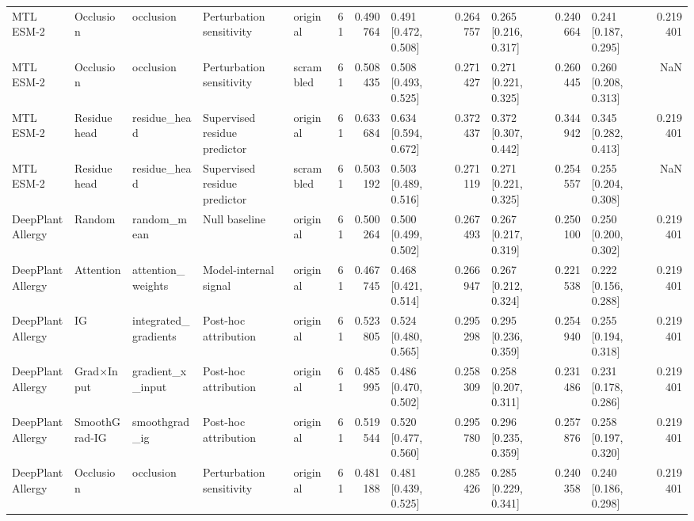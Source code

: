 \begin{tabular}{lllllrrlrlrlr}
MTL ESM-2 & Occlusion & occlusion & Perturbation sensitivity & original & 61 & 0.490764 & 0.491 [0.472, 0.508] & 0.264757 & 0.265 [0.216, 0.317] & 0.240664 & 0.241 [0.187, 0.295] & 0.219401 \\
MTL ESM-2 & Occlusion & occlusion & Perturbation sensitivity & scrambled & 61 & 0.508435 & 0.508 [0.493, 0.525] & 0.271427 & 0.271 [0.221, 0.325] & 0.260445 & 0.260 [0.208, 0.313] & NaN \\
MTL ESM-2 & Residue head & residue_head & Supervised residue predictor & original & 61 & 0.633684 & 0.634 [0.594, 0.672] & 0.372437 & 0.372 [0.307, 0.442] & 0.344942 & 0.345 [0.282, 0.413] & 0.219401 \\
MTL ESM-2 & Residue head & residue_head & Supervised residue predictor & scrambled & 61 & 0.503192 & 0.503 [0.489, 0.516] & 0.271119 & 0.271 [0.221, 0.325] & 0.254557 & 0.255 [0.204, 0.308] & NaN \\
DeepPlantAllergy & Random & random_mean & Null baseline & original & 61 & 0.500264 & 0.500 [0.499, 0.502] & 0.267493 & 0.267 [0.217, 0.319] & 0.250100 & 0.250 [0.200, 0.302] & 0.219401 \\
DeepPlantAllergy & Attention & attention_weights & Model-internal signal & original & 61 & 0.467745 & 0.468 [0.421, 0.514] & 0.266947 & 0.267 [0.212, 0.324] & 0.221538 & 0.222 [0.156, 0.288] & 0.219401 \\
DeepPlantAllergy & IG & integrated_gradients & Post-hoc attribution & original & 61 & 0.523805 & 0.524 [0.480, 0.565] & 0.295298 & 0.295 [0.236, 0.359] & 0.254940 & 0.255 [0.194, 0.318] & 0.219401 \\
DeepPlantAllergy & Grad×Input & gradient_x_input & Post-hoc attribution & original & 61 & 0.485995 & 0.486 [0.470, 0.502] & 0.258309 & 0.258 [0.207, 0.311] & 0.231486 & 0.231 [0.178, 0.286] & 0.219401 \\
DeepPlantAllergy & SmoothGrad-IG & smoothgrad_ig & Post-hoc attribution & original & 61 & 0.519544 & 0.520 [0.477, 0.560] & 0.295780 & 0.296 [0.235, 0.359] & 0.257876 & 0.258 [0.197, 0.320] & 0.219401 \\
DeepPlantAllergy & Occlusion & occlusion & Perturbation sensitivity & original & 61 & 0.481188 & 0.481 [0.439, 0.525] & 0.285426 & 0.285 [0.229, 0.341] & 0.240358 & 0.240 [0.186, 0.298] & 0.219401 \\
\bottomrule
\end{tabular}
